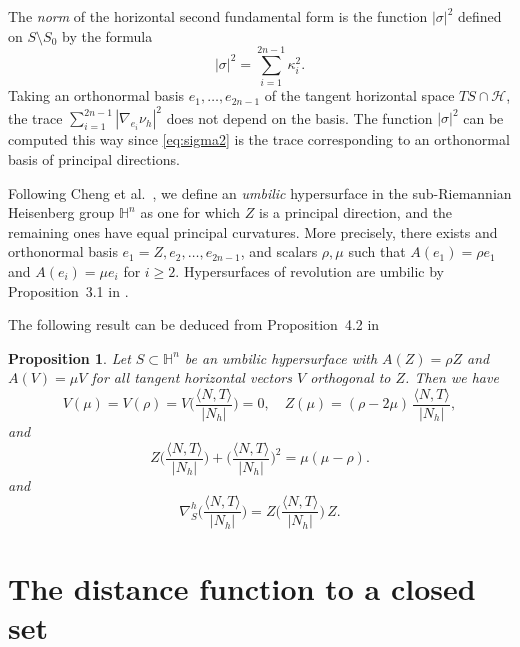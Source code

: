 \documentclass[10pt]{amsart}
\newtheorem{proposition}[theorem]{Proposition}
\theoremstyle{definition}
\theoremstyle{remark}
\numberwithin{equation}{section}
\begin{document}
The \emph{norm} of the horizontal second fundamental form is the function $|{\sigma}|^2$ defined on $S\setminus S_0$ by the formula
\begin{equation}
\label{eq:sigma2}
|{\sigma}|^2=\sum_{i=1}^{2n-1} \kappa_i^2.
\end{equation}
Taking an orthonormal basis $e_1,\ldots,e_{2n-1}$ of the tangent horizontal space $TS\cap {\mathcal{H}}$, the trace $\sum_{i=1}^{2n-1}|\nabla_{e_i}{\nu_{h}}|^2$ does not depend on the basis. The function $|{\sigma}|^2$ can be computed this way since \eqref{eq:sigma2} is the trace corresponding to an orthonormal basis of principal directions.

Following Cheng et al.~\cite{cchy}, we define an \emph{umbilic} hypersurface in the sub-Rie\-mannian Heisenberg group ${{\mathbb{H}}}^n$ as one for which $Z$ is a principal direction, and the remaining ones have equal principal curvatures. More precisely, there exists and orthonormal basis $e_1=Z,e_2,\ldots,e_{2n-1}$, and scalars $\rho,\mu$ such that $A(e_1)=\rho e_1$ and $A(e_i)=\mu e_i$ for $i{\geqslant} 2$. Hypersurfaces of revolution are umbilic by Proposition~3.1 in \cite{cchy}.

The following result can be deduced from Proposition~4.2 in \cite{cchy}

\begin{proposition}
\label{prop:cchy}
Let $S\subset{{\mathbb{H}}}^n$ be an umbilic hypersurface with $A(Z)=\rho Z$ and $A(V)=\mu V$ for all tangent horizontal vectors $V$ orthogonal to $Z$. Then we have
\begin{equation}
V(\mu)=V(\rho)=V\bigg({\frac{{\langle{N,T}\rangle}}{|N_h|}}\bigg)=0,\quad Z(\mu)=(\rho-2\mu)\,{\frac{{\langle{N,T}\rangle}}{|N_h|}},
\end{equation}
and
\begin{equation}
Z\bigg({\frac{{\langle{N,T}\rangle}}{|N_h|}}\bigg)+\bigg({\frac{{\langle{N,T}\rangle}}{|N_h|}}\bigg)^2=\mu(\mu-\rho).
\end{equation}
and
\begin{equation}
\nabla_S^h\bigg({\frac{{\langle{N,T}\rangle}}{|N_h|}}\bigg)=Z\bigg({\frac{{\langle{N,T}\rangle}}{|N_h|}}\bigg)\,Z.
\end{equation}
\end{proposition}

\section{The distance function to a closed set}
\label{sec:distance}
\end{document}
